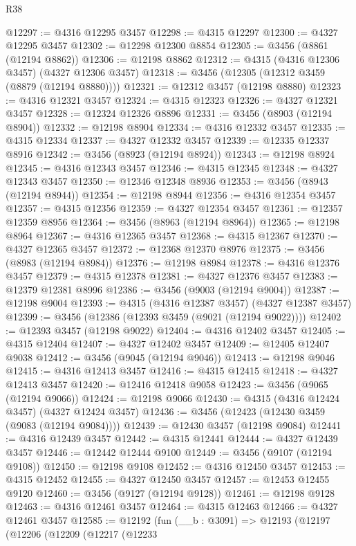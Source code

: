 \begin{lexlean}{R38}
\begin{coremodule}
@12297 := @4316 @12295 @3457
@12298 := @4315 @12297
@12300 := @4327 @12295 @3457
@12302 := @12298 @12300 @8854
@12305 := @3456 (@8861 (@12194 @8862))
@12306 := @12198 @8862
@12312 := @4315 (@4316 @12306 @3457) (@4327 @12306 @3457)
@12318 := @3456 (@12305 (@12312 @3459 (@8879 (@12194 @8880))))
@12321 := @12312 @3457 (@12198 @8880)
@12323 := @4316 @12321 @3457
@12324 := @4315 @12323
@12326 := @4327 @12321 @3457
@12328 := @12324 @12326 @8896
@12331 := @3456 (@8903 (@12194 @8904))
@12332 := @12198 @8904
@12334 := @4316 @12332 @3457
@12335 := @4315 @12334
@12337 := @4327 @12332 @3457
@12339 := @12335 @12337 @8916
@12342 := @3456 (@8923 (@12194 @8924))
@12343 := @12198 @8924
@12345 := @4316 @12343 @3457
@12346 := @4315 @12345
@12348 := @4327 @12343 @3457
@12350 := @12346 @12348 @8936
@12353 := @3456 (@8943 (@12194 @8944))
@12354 := @12198 @8944
@12356 := @4316 @12354 @3457
@12357 := @4315 @12356
@12359 := @4327 @12354 @3457
@12361 := @12357 @12359 @8956
@12364 := @3456 (@8963 (@12194 @8964))
@12365 := @12198 @8964
@12367 := @4316 @12365 @3457
@12368 := @4315 @12367
@12370 := @4327 @12365 @3457
@12372 := @12368 @12370 @8976
@12375 := @3456 (@8983 (@12194 @8984))
@12376 := @12198 @8984
@12378 := @4316 @12376 @3457
@12379 := @4315 @12378
@12381 := @4327 @12376 @3457
@12383 := @12379 @12381 @8996
@12386 := @3456 (@9003 (@12194 @9004))
@12387 := @12198 @9004
@12393 := @4315 (@4316 @12387 @3457) (@4327 @12387 @3457)
@12399 := @3456 (@12386 (@12393 @3459 (@9021 (@12194 @9022))))
@12402 := @12393 @3457 (@12198 @9022)
@12404 := @4316 @12402 @3457
@12405 := @4315 @12404
@12407 := @4327 @12402 @3457
@12409 := @12405 @12407 @9038
@12412 := @3456 (@9045 (@12194 @9046))
@12413 := @12198 @9046
@12415 := @4316 @12413 @3457
@12416 := @4315 @12415
@12418 := @4327 @12413 @3457
@12420 := @12416 @12418 @9058
@12423 := @3456 (@9065 (@12194 @9066))
@12424 := @12198 @9066
@12430 := @4315 (@4316 @12424 @3457) (@4327 @12424 @3457)
@12436 := @3456 (@12423 (@12430 @3459 (@9083 (@12194 @9084))))
@12439 := @12430 @3457 (@12198 @9084)
@12441 := @4316 @12439 @3457
@12442 := @4315 @12441
@12444 := @4327 @12439 @3457
@12446 := @12442 @12444 @9100
@12449 := @3456 (@9107 (@12194 @9108))
@12450 := @12198 @9108
@12452 := @4316 @12450 @3457
@12453 := @4315 @12452
@12455 := @4327 @12450 @3457
@12457 := @12453 @12455 @9120
@12460 := @3456 (@9127 (@12194 @9128))
@12461 := @12198 @9128
@12463 := @4316 @12461 @3457
@12464 := @4315 @12463
@12466 := @4327 @12461 @3457
@12585 := @12192
    (fun (__b : @3091) =>
    @12193
      (@12197
        (@12206
          (@12209
            (@12217
              (@12233

\end{coremodule}
\end{lexlean}
